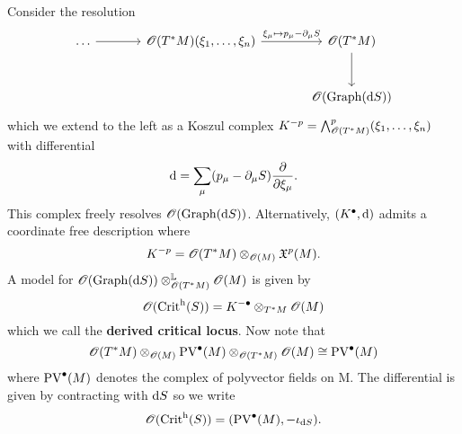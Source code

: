 \begin{example}
\begin{itemize}
\begin{align*}
    \end{align*}
    Consider the resolution
    \begin{equation*}
      \begin{tikzcd}[sep=large]
        \dots \arrow[r] &
        \Oscr(T^* M) (\xi_1, \dots, \xi_n) \arrow[r, "\xi_{\mu} \mapsto p_{\mu} - \partial_{\mu} S"] &
        \Oscr(T^* M) \arrow[d] \\ &&
        \Oscr(\Graph(\drm S))
      \end{tikzcd}
    \end{equation*}
    which we extend to the left as a Koszul complex
    $K^{-p} = \bigwedge_{\mathscr{O}(T^* M)}^p (\xi_1, \dots, \xi_n)$
    with differential 
    \begin{equation*}
      \mathrm{d} = \sum_{\mu} (p_{\mu} - \partial_{\mu} S) \frac{\partial}{\partial \xi_{\mu}}.
    \end{equation*}
    This complex freely resolves $\mathscr{O}(\operatorname{Graph}(\mathrm{d} S))$. Alternatively, $(K^\bullet, \mathrm{d})$ admits a coordinate free description where
    \begin{equation*}
      K^{-p} = \mathscr{O}(T^* M) \otimes_{\mathscr{O}(M)} \mathfrak{X}^p (M).
    \end{equation*}
    A model for $\mathscr{O}(\operatorname{Graph}(\mathrm{d} S)) \otimes_{\mathscr{O}(T^* M)}^{\mathbb{L}} \mathscr{O}(M)$ is given by
    \begin{equation*}
      \mathscr{O}(\operatorname{Crit}^{\mathrm{h}}(S)) = K^{-\bullet} \otimes_{T^* M} \mathscr{O}(M)
    \end{equation*}
    which we call the \textbf{derived critical locus}.
    Now note that
    \begin{equation*}
      \mathscr{O}(T^* M) \otimes_{\mathscr{O}(M)} \operatorname{PV}^\bullet(M) \otimes_{\mathscr{O}(T^* M)} \mathscr{O}(M) \cong \operatorname{PV}^\bullet(M)
    \end{equation*}
    where $\operatorname{PV}^\bullet(M)$ denotes the complex of polyvector fields on M. The differential is given by contracting with $\mathrm{d} S$ so we write
    \begin{equation*}
      \mathscr{O}(\operatorname{Crit}^{\mathrm{h}}(S)) = (\operatorname{PV}^\bullet(M), -\iota_{\mathrm{d} S}).
    \end{equation*}
  \end{itemize}
\end{example}
